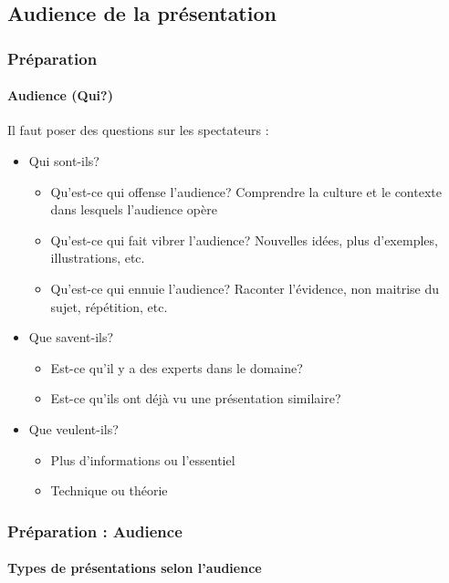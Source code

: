 \documentclass[xcolor=table, usenames,dvipsnames]{beamer}
\begin{document}
\subsection{Audience de la présentation}

\begin{frame}
\frametitle{Préparation}
\framesubtitle{Audience (Qui?)}

Il faut poser des questions sur les spectateurs : 
\begin{itemize}
	\item Qui sont-ils?
	\begin{itemize}
		\item Qu'est-ce qui offense l'audience? Comprendre la culture et le contexte dans lesquels l'audience opère
		\item Qu'est-ce qui fait vibrer l'audience? Nouvelles idées, plus d'exemples, illustrations, etc.
		\item Qu'est-ce qui ennuie l'audience? Raconter l'évidence, non maitrise du sujet, répétition, etc.
	\end{itemize}
	\item Que savent-ils?
	\begin{itemize}
		\item Est-ce qu'il y a des experts dans le domaine?
		\item Est-ce qu'ils ont déjà vu une présentation similaire?
	\end{itemize}
	\item Que veulent-ils?
	\begin{itemize}
		\item Plus d'informations ou l'essentiel
		\item Technique ou théorie
	\end{itemize}
\end{itemize}

\end{frame}

\begin{frame}
\frametitle{Préparation : Audience}
\framesubtitle{Types de présentations selon l'audience}

\end{frame}
\end{document}
